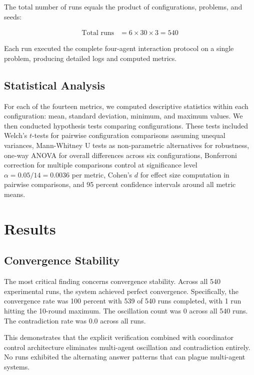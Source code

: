 \documentclass[conference]{IEEEtran}
\begin{document}
The total number of runs equals the product of configurations, problems, and seeds:

\begin{align*}
\text{Total runs} &= 6 \times 30 \times 3 = 540
\end{align*}

Each run executed the complete four-agent interaction protocol on a single problem, producing detailed logs and computed metrics.

\subsection{Statistical Analysis}

For each of the fourteen metrics, we computed descriptive statistics within each configuration: mean, standard deviation, minimum, and maximum values. We then conducted hypothesis tests comparing configurations. These tests included Welch's $t$-tests for pairwise configuration comparisons assuming unequal variances, Mann-Whitney U tests as non-parametric alternatives for robustness, one-way ANOVA for overall differences across six configurations, Bonferroni correction for multiple comparisons control at significance level $\alpha = 0.05 / 14 = 0.0036$ per metric, Cohen's $d$ for effect size computation in pairwise comparisons, and 95 percent confidence intervals around all metric means.

\section{Results}

\subsection{Convergence Stability}

The most critical finding concerns convergence stability. Across all 540 experimental runs, the system achieved perfect convergence. Specifically, the convergence rate was 100 percent with 539 of 540 runs completed, with 1 run hitting the 10-round maximum. The oscillation count was 0 across all 540 runs. The contradiction rate was 0.0 across all runs.

This demonstrates that the explicit verification combined with coordinator control architecture eliminates multi-agent oscillation and contradiction entirely. No runs exhibited the alternating answer patterns that can plague multi-agent systems.
\end{document}
